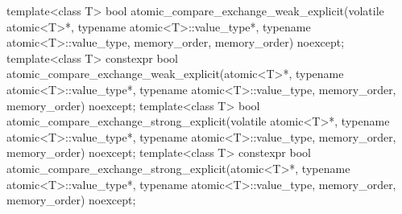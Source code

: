 \begin{codeblock}
{  template<class T>
    bool atomic_compare_exchange_weak_explicit(volatile atomic<T>*,
                                               typename atomic<T>::value_type*,
                                               typename atomic<T>::value_type,
                                               memory_order, memory_order) noexcept;
  template<class T>
    constexpr bool atomic_compare_exchange_weak_explicit(atomic<T>*,
                                                         typename atomic<T>::value_type*,
                                                         typename atomic<T>::value_type,
                                                         memory_order, memory_order) noexcept;
  template<class T>
    bool atomic_compare_exchange_strong_explicit(volatile atomic<T>*,
                                                 typename atomic<T>::value_type*,
                                                 typename atomic<T>::value_type,
                                                 memory_order, memory_order) noexcept;
  template<class T>
    constexpr bool atomic_compare_exchange_strong_explicit(atomic<T>*,
                                                           typename atomic<T>::value_type*,
                                                           typename atomic<T>::value_type,
                                                           memory_order, memory_order) noexcept;

}
\end{codeblock}
